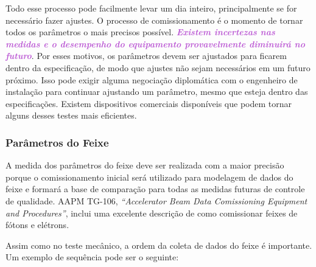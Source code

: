 \documentclass[11pt,a4paper]{article}
\newcounter{exemplo}
\begin{document}
	Todo esse processo pode facilmente levar um dia inteiro, principalmente se for necessário fazer ajustes. O processo de comissionamento é o momento de tornar todos os parâmetros o mais precisos possível. \textcolor{MediumOrchid}{\textbf{\textit{Existem incertezas nas medidas e o desempenho do equipamento provavelmente diminuirá no futuro}}}. Por esses motivos, os parâmetros devem ser ajustados para ficarem dentro da especificação, de modo que ajustes não sejam necessários em um futuro próximo. Isso pode exigir alguma negociação diplomática com o engenheiro de instalação para continuar ajustando um parâmetro, mesmo que esteja dentro das especificações. Existem dispositivos comerciais disponíveis que podem tornar alguns desses testes mais eficientes.

\subsubsection*{Parâmetros do Feixe}

	A medida dos parâmetros do feixe deve ser realizada com a maior precisão porque o comissionamento inicial será utilizado para modelagem de dados do feixe e formará a base de comparação para todas as medidas futuras de controle de qualidade. AAPM TG-106, \textit{``Accelerator Beam Data Comissioning Equipment and Procedures''}, inclui uma excelente descrição de como comissionar feixes de fótons e elétrons.

	Assim como no teste mecânico, a ordem da coleta de dados do feixe é importante. Um exemplo de sequência pode ser o seguinte:
\end{document}

